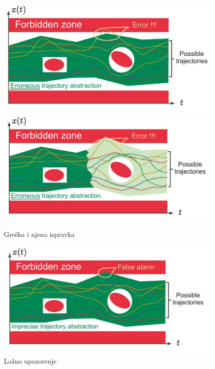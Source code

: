 \documentclass[a4paper]{article}
\begin{document}
\begin{figure}[h!]
\begin{center}
\includegraphics[scale=0.2]{graf6.JPG}
\includegraphics[scale=0.2]{graf7.JPG}
\end{center}
\caption{Greška i njena ispravka}
\label{fig:graf67}
\end{figure} 

\begin{figure}[h!]
\begin{center}
\includegraphics[scale=0.3]{graf8.JPG}
\end{center}
\caption{Lažno upozorenje}
\label{fig:graf8}
\end{figure} 
\end{document}
